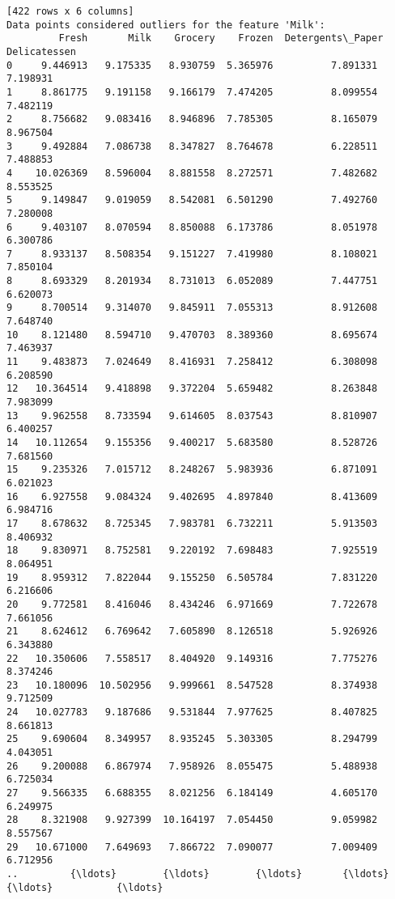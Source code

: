 \documentclass[11pt]{article}
\begin{document}
\begin{Verbatim}[commandchars=\\\{\}]
[422 rows x 6 columns]
Data points considered outliers for the feature 'Milk':
         Fresh       Milk    Grocery    Frozen  Detergents\_Paper  Delicatessen
0     9.446913   9.175335   8.930759  5.365976          7.891331      7.198931
1     8.861775   9.191158   9.166179  7.474205          8.099554      7.482119
2     8.756682   9.083416   8.946896  7.785305          8.165079      8.967504
3     9.492884   7.086738   8.347827  8.764678          6.228511      7.488853
4    10.026369   8.596004   8.881558  8.272571          7.482682      8.553525
5     9.149847   9.019059   8.542081  6.501290          7.492760      7.280008
6     9.403107   8.070594   8.850088  6.173786          8.051978      6.300786
7     8.933137   8.508354   9.151227  7.419980          8.108021      7.850104
8     8.693329   8.201934   8.731013  6.052089          7.447751      6.620073
9     8.700514   9.314070   9.845911  7.055313          8.912608      7.648740
10    8.121480   8.594710   9.470703  8.389360          8.695674      7.463937
11    9.483873   7.024649   8.416931  7.258412          6.308098      6.208590
12   10.364514   9.418898   9.372204  5.659482          8.263848      7.983099
13    9.962558   8.733594   9.614605  8.037543          8.810907      6.400257
14   10.112654   9.155356   9.400217  5.683580          8.528726      7.681560
15    9.235326   7.015712   8.248267  5.983936          6.871091      6.021023
16    6.927558   9.084324   9.402695  4.897840          8.413609      6.984716
17    8.678632   8.725345   7.983781  6.732211          5.913503      8.406932
18    9.830971   8.752581   9.220192  7.698483          7.925519      8.064951
19    8.959312   7.822044   9.155250  6.505784          7.831220      6.216606
20    9.772581   8.416046   8.434246  6.971669          7.722678      7.661056
21    8.624612   6.769642   7.605890  8.126518          5.926926      6.343880
22   10.350606   7.558517   8.404920  9.149316          7.775276      8.374246
23   10.180096  10.502956   9.999661  8.547528          8.374938      9.712509
24   10.027783   9.187686   9.531844  7.977625          8.407825      8.661813
25    9.690604   8.349957   8.935245  5.303305          8.294799      4.043051
26    9.200088   6.867974   7.958926  8.055475          5.488938      6.725034
27    9.566335   6.688355   8.021256  6.184149          4.605170      6.249975
28    8.321908   9.927399  10.164197  7.054450          9.059982      8.557567
29   10.671000   7.649693   7.866722  7.090077          7.009409      6.712956
..         {\ldots}        {\ldots}        {\ldots}       {\ldots}               {\ldots}           {\ldots}

\end{Verbatim}
\end{document}
